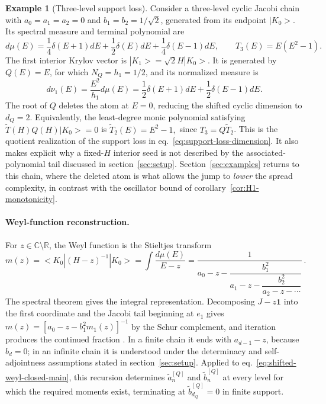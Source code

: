 \documentclass[a4paper,11pt]{article}
\def\ket#1{|#1>}%
\def\bra#1{<#1|}%
\def\dd{d}%
\def\Jac{J}%
\theoremstyle{definition}
\newtheorem{example}[proposition]{Example}
\theoremstyle{remark}
\newcommand{\ket}[1]{|#1\rangle}
\newcommand{\bra}[1]{\langle #1|}
\newcommand{\dd}{\mathrm d}
\newcommand{\CC}{\mathbb C}
\newcommand{\RR}{\mathbb R}
\newcommand{\Jac}{\mathsf J}
\newcommand{\Id}{\mathbf 1}
\begin{document}
\begin{example}[Three-level support loss]
\label{ex:spin-one-support-loss}
Consider a three-level cyclic Jacobi chain with $a_0=a_1=a_2=0$ and
$b_1=b_2=1/\sqrt2$, generated from its endpoint $\ket{K_0}$.  Its
spectral measure and terminal polynomial are
\begin{equation}
   \dd\mu(E)=\frac14\delta(E+1)\dd E
   +\frac12\delta(E)\dd E
   +\frac14\delta(E-1)\dd E,
   \qquad
   T_3(E)=E(E^2-1).
\end{equation}
The first interior Krylov vector is $\ket{K_1}=\sqrt2H\ket{K_0}$. It is generated by $Q(E)=E$, for which $N_Q=h_1=1/2$, and its normalized measure is
\begin{equation}
   \dd\nu_1(E)=\frac{E^2}{h_1}\dd\mu(E)
   =\frac12\delta(E+1)\dd E
   +\frac12\delta(E-1)\dd E.
   \label{eq:spin-one-support-loss-app}
\end{equation}
The root of $Q$ deletes the atom at $E=0$, reducing the shifted cyclic dimension to $d_Q=2$. Equivalently, the least-degree monic polynomial satisfying $\widetilde T(H)Q(H)\ket{K_0}=0$ is
$
   \widetilde T_2(E)=E^2-1,
$
since $T_3=Q\widetilde T_2$. This is the quotient realization of the support loss in eq.~\eqref{eq:support-loss-dimension}. It also makes explicit why a fixed-$H$ interior seed is not described by the associated-polynomial tail discussed in section~\ref{sec:setup}. Section~\ref{sec:examples} returns to this chain, where the deleted atom is what allows the jump to \emph{lower} the spread complexity, in contrast with the oscillator bound of corollary~\ref{cor:H1-monotonicity}.
\end{example}

\paragraph{Weyl-function reconstruction.}
For $z\in\CC\setminus\RR$, the Weyl function is the Stieltjes transform
\begin{equation}
   m(z)=\bra{K_0}(H-z)^{-1}\ket{K_0}
   =\int\frac{\dd\mu(E)}{E-z}
   =\frac{1}{a_0-z-
   \dfrac{b_1^2}{a_1-z-
   \dfrac{b_2^2}{a_2-z-\cdots}}}\,.
\end{equation}
The spectral theorem gives the integral representation. Decomposing $\Jac-z\Id$ into the first coordinate and the Jacobi tail beginning at $e_1$ gives
$
   m(z)=[a_0-z-b_1^2m_1(z)]^{-1}
$
by the Schur complement, and iteration produces the continued fraction \cite{Chihara1978,SimonOPRL1,GesztesySimon1997}. In a finite chain it ends with $a_{d-1}-z$, because $b_d=0$; in an infinite chain it is understood under the determinacy and self-adjointness assumptions stated in section~\ref{sec:setup}. Applied to eq.~\eqref{eq:shifted-weyl-closed-main}, this recursion determines $\widetilde a_n^{[Q]}$ and $\widetilde b_n^{[Q]}$ at every level for which the required moments exist, terminating at $\widetilde b_{d_Q}^{[Q]}=0$ in finite support.
\end{document}

